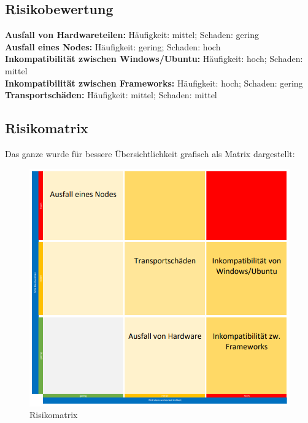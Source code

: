 \documentclass[12pt,oneside,a4paper,parskip]{scrbook}
\begin{document}
\subsection{Risikobewertung}
\textbf{Ausfall von Hardwareteilen:} Häufigkeit: mittel; Schaden: gering \\
\textbf{Ausfall eines Nodes:} Häufigkeit: gering; Schaden: hoch \\
\textbf{Inkompatibilität zwischen Windows/Ubuntu:} Häufigkeit: hoch; Schaden: mittel \\
\textbf{Inkompatibilität zwischen Frameworks:} Häufigkeit: hoch; Schaden: gering \\
\textbf{Transportschäden:} Häufigkeit: mittel; Schaden: mittel \\
\subsection{Risikomatrix}

Das ganze wurde für bessere Übersichtlichkeit grafisch als Matrix dargestellt:

\begin{figure}[H]
\caption{Risikomatrix}
\label{risikoMatrix}
\centering
\includegraphics[scale=0.8]{pictures/risikoanalyse.png}
\end{figure}
\end{document}
